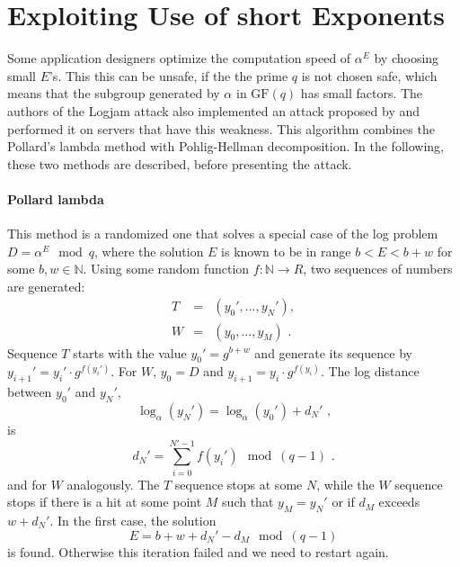 \documentclass[paper=a4, fontsize=11pt]{scrartcl} %
\numberwithin{equation}{section} %
\numberwithin{figure}{section} %
\numberwithin{table}{section} %
\begin{document}
\section{Exploiting Use of short Exponents}
Some application designers optimize the computation speed of $\alpha^E$ by choosing small $E$'s. This this can be unsafe, if the the prime $q$ is not chosen safe, which means that the subgroup generated by $\alpha$ in $\mathrm{GF}(q)$ has small factors. The authors of the Logjam attack also implemented an attack proposed by \citep{van1996diffie} and performed it on servers that have this weakness. This algorithm combines the Pollard's lambda method with Pohlig-Hellman decomposition. In the following, these two methods are described, before presenting the attack.

\paragraph{Pollard lambda} This method is a randomized one that solves a special case of the log problem $D = \alpha^E\mod q$, where the solution $E$ is known to be in range $b<E<b+w$ for some $b,w\in \mathbb{N}$. Using some random function $f:\mathbb{N}\rightarrow R$, two sequences of numbers are generated:
\begin{equation}
\begin{array}{lcl}
T & = & (y_0',...,y_N'),\\
W & = & (y_0,...,y_M)
\text{ .}
\end{array}
\end{equation}
Sequence $T$ starts with the value $y_0' = g^{b+w}$ and generate its sequence by $y_{i+1}' = y_i'\cdot g^{f(y_i')}$. For $W$, $y_0 = D$ and $y_{i+1} = y_i\cdot g^{f(y_i)}$. The log distance between $y_0'$ and $y_N'$,
\begin{equation}
\log_\alpha(y_N') = \log_\alpha(y_0') + d_N'
\text{ ,}
\end{equation}
is
\begin{equation}
d_N' = \sum_{i=0}^{N'-1}f(y_i')\mod (q-1)
\text{ .}
\end{equation}
and for $W$ analogously. The $T$ sequence stops at some $N$, while the $W$ sequence stops if there is a hit at some point $M$ such that $y_M = y_N'$ or if $d_M$ exceeds $w+d_N'$. In the first case, the solution
\begin{equation}
E = b + w + d_N' - d_M \mod (q-1)
\end{equation}
is found. Otherwise this iteration failed and we need to restart again.
\end{document}
